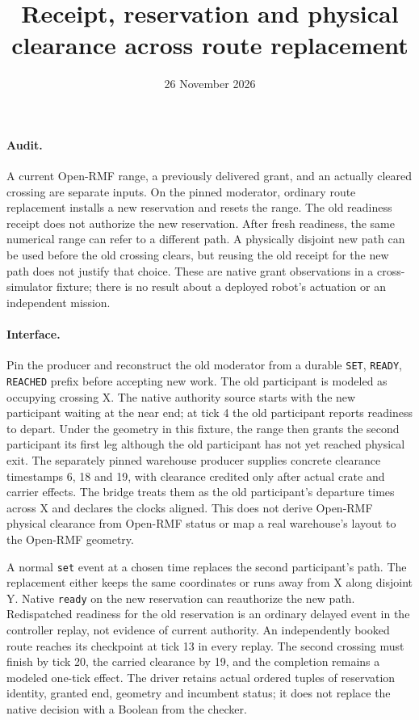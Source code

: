 \documentclass[11pt]{article}
\begin{document}
\title{Receipt, reservation and physical clearance across route replacement}
\author{}
\date{26 November 2026}
\maketitle

\paragraph{Audit.}
A current Open-RMF range, a previously delivered grant, and an actually
cleared crossing are separate inputs. On the pinned moderator, ordinary
route replacement installs a new reservation and resets the range.
The old readiness receipt does not authorize the new reservation.
After fresh readiness, the same numerical range can refer to a
different path. A physically disjoint new path can be used before the
old crossing clears, but reusing the old receipt for the new path
does not justify that choice. These are native grant observations in a
cross-simulator fixture; there is no result about a deployed robot's
actuation or an independent mission.

\paragraph{Interface.}
Pin the producer and reconstruct the old moderator from a durable
\texttt{SET}, \texttt{READY}, \texttt{REACHED} prefix before accepting
new work. The old participant is modeled as occupying crossing X.
The native authority source starts with the new participant waiting
at the near end; at tick 4 the old participant reports readiness
to depart. Under the geometry in this fixture, the range then grants
the second participant its first leg although the old participant
has not yet reached physical exit. The separately pinned warehouse
producer supplies concrete clearance timestamps 6, 18 and 19, with
clearance credited only after actual crate and carrier effects. The
bridge treats them as the old participant's departure times across
X and declares the clocks aligned. This does not derive Open-RMF
physical clearance from Open-RMF status or map a real warehouse's
layout to the Open-RMF geometry.

A normal \texttt{set} event at a chosen time replaces the second
participant's path. The replacement either keeps the same coordinates
or runs away from X along disjoint Y. Native \texttt{ready} on the
new reservation can reauthorize the new path. Redispatched readiness
for the old reservation is an ordinary delayed event in the controller
replay, not evidence of current authority. An independently booked
route reaches its checkpoint at tick 13 in every replay. The second
crossing must finish by tick 20, the carried clearance by 19, and
the completion remains a modeled one-tick effect.
The driver retains actual ordered tuples of reservation identity,
granted end, geometry and incumbent status; it does not replace the
native decision with a Boolean from the checker.
\end{document}
